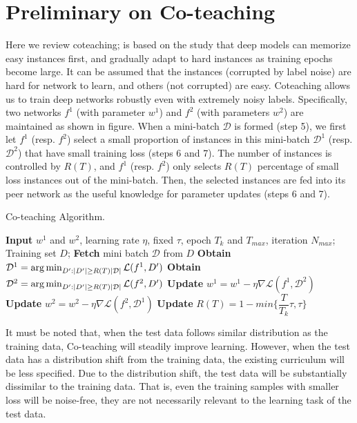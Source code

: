 \section{Preliminary on Co-teaching}
Here we review coteaching\cite{coteaching}; is based on the study that deep models can memorize easy instances first, and gradually adapt to hard instances as training epochs become large\cite{memorization}. It can be assumed that the instances (corrupted by label noise) are hard for network to learn, and others (not corrupted) are easy. 
Coteaching allows us to train deep networks robustly even with extremely noisy labels. Specifically, two networks $f^1$ (with parameter $w^1$) and $f^2$ (with parameters $w^2$) are maintained as shown in figure. When a mini-batch $\mathcal{D}$ is formed (step 5), we first let $f^1$ (resp. $f^2$) select a small proportion of instances in this mini-batch $\mathcal{D}^1$ (resp. $\mathcal{D}^2$) that have small training loss (steps 6 and 7). The number of instances is controlled by $R(T)$, and $f^1$ (resp. $f^2$) only selects $R(T)$ percentage of small loss instances out of the mini-batch. Then, the selected instances are fed into its peer network as the useful knowledge for parameter updates (steps 6 and 7).
\begin{algorithm}[H]
	\caption{Co-teaching Algorithm.} 
	\begin{algorithmic}[1]
	    \State \textbf{Input} $w^1$ and $w^2$, learning rate $\eta$, fixed $\tau$, epoch $T_k$ and $T_{max}$, iteration $N_{max}$;
		    \State Training set ${D}$;
				    \State \textbf{Fetch} mini batch $\mathcal{D}$ from ${D}$
				    \State \textbf{Obtain} $\mathcal{D}^1 = \operatorname*{arg\,min}_{D':|D'|\geq R(T)|\mathcal{D}|} \mathcal{L}(f^1, D')$ 
				    \State \textbf{Obtain} $\mathcal{D}^2 = \operatorname*{arg\,min}_{D':|D'|\geq R(T)|\mathcal{D}|} \mathcal{L}(f^2, D')$
				    \State \textbf{Update} $w^1 = w^1 - \eta \nabla \mathcal{L}(f^1,\mathcal{D}^2)$
				    \State \textbf{Update} $w^2 = w^2 - \eta \nabla \mathcal{L}(f^2,\mathcal{D}^1)$
			    \EndFor
			 \State \textbf{Update} $R(T)= 1- min\bigg\{\dfrac{T}{T_k}\tau, \tau\bigg\}$
		\EndFor
	\end{algorithmic} 
\end{algorithm}


It must be noted that, when the test data follows similar distribution as the training data, Co-teaching will steadily improve learning. However, when the test data has a distribution shift from the training data, the existing curriculum
will be less specified. Due to the distribution shift, the test data will be substantially dissimilar to the training data. That is, even the training samples with smaller loss will be noise-free, they are not necessarily relevant to the learning
task of the test data.
